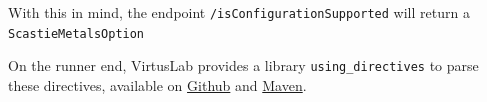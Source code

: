 \documentclass{article}
\begin{document}
With this in mind, the endpoint \lstinline{/isConfigurationSupported} will return a \lstinline{ScastieMetalsOption}





On the runner end, VirtusLab provides a library \lstinline{using_directives} to parse these directives, available on \href{https://github.com/VirtusLab/using_directives}{Github} and \href{https://mvnrepository.com/artifact/org.virtuslab.scala-cli/directives_3}{Maven}.
\end{document}
